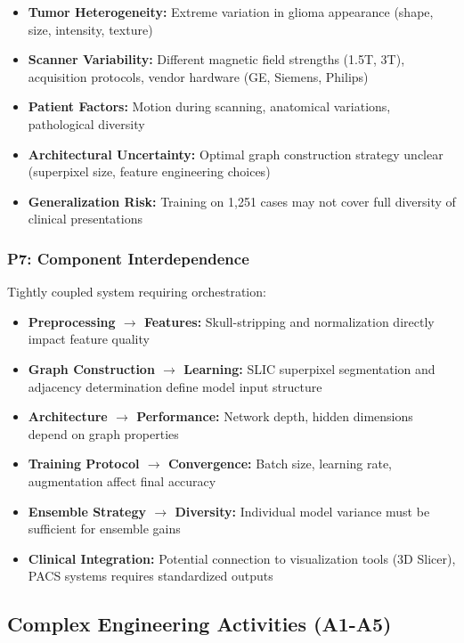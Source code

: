 \begin{itemize}
    \item \textbf{Tumor Heterogeneity:} Extreme variation in glioma appearance (shape, size, intensity, texture)
    \item \textbf{Scanner Variability:} Different magnetic field strengths (1.5T, 3T), acquisition protocols, vendor hardware (GE, Siemens, Philips)
    \item \textbf{Patient Factors:} Motion during scanning, anatomical variations, pathological diversity
    \item \textbf{Architectural Uncertainty:} Optimal graph construction strategy unclear (superpixel size, feature engineering choices)
    \item \textbf{Generalization Risk:} Training on 1,251 cases may not cover full diversity of clinical presentations
\end{itemize}

\subsubsection*{P7: Component Interdependence}

Tightly coupled system requiring orchestration:

\begin{itemize}
    \item \textbf{Preprocessing $\rightarrow$ Features:} Skull-stripping and normalization directly impact feature quality
    \item \textbf{Graph Construction $\rightarrow$ Learning:} SLIC superpixel segmentation and adjacency determination define model input structure
    \item \textbf{Architecture $\rightarrow$ Performance:} Network depth, hidden dimensions depend on graph properties
    \item \textbf{Training Protocol $\rightarrow$ Convergence:} Batch size, learning rate, augmentation affect final accuracy
    \item \textbf{Ensemble Strategy $\rightarrow$ Diversity:} Individual model variance must be sufficient for ensemble gains
    \item \textbf{Clinical Integration:} Potential connection to visualization tools (3D Slicer), PACS systems requires standardized outputs
\end{itemize}

\subsection*{Complex Engineering Activities (A1-A5)}

